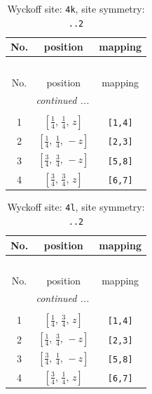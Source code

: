 \documentclass[fleqn,8pt]{jsarticle}
\begin{document}
\renewcommand{\arraystretch}{1.2}
\begin{longtable}{ccc}
\caption{Wyckoff site: {\tt 4k}, site symmetry: {\tt ..2}}
 \\
 \hline \hline
No. & position & mapping \\ \hline \endfirsthead

\multicolumn{2}{l}{\tablename\ \thetable{}} \\
 \hline \hline
No. & position & mapping \\ \hline \endhead

 \hline \hline
\multicolumn{2}{r}{\footnotesize\it continued ...} \\ \endfoot

 \hline \hline
\multicolumn{2}{r}{} \\ \endlastfoot

1 & $\left[ \frac{1}{4},\, \frac{1}{4},\, z \right]$ & {\tt [1,4]} \\ \hline
2 & $\left[ \frac{1}{4},\, \frac{1}{4},\, - z \right]$ & {\tt [2,3]} \\ \hline
3 & $\left[ \frac{3}{4},\, \frac{3}{4},\, - z \right]$ & {\tt [5,8]} \\ \hline
4 & $\left[ \frac{3}{4},\, \frac{3}{4},\, z \right]$ & {\tt [6,7]} \\
\end{longtable}
\renewcommand{\arraystretch}{1.2}
\begin{longtable}{ccc}
\caption{Wyckoff site: {\tt 4l}, site symmetry: {\tt ..2}}
 \\
 \hline \hline
No. & position & mapping \\ \hline \endfirsthead

\multicolumn{2}{l}{\tablename\ \thetable{}} \\
 \hline \hline
No. & position & mapping \\ \hline \endhead

 \hline \hline
\multicolumn{2}{r}{\footnotesize\it continued ...} \\ \endfoot

 \hline \hline
\multicolumn{2}{r}{} \\ \endlastfoot

1 & $\left[ \frac{1}{4},\, \frac{3}{4},\, z \right]$ & {\tt [1,4]} \\ \hline
2 & $\left[ \frac{1}{4},\, \frac{3}{4},\, - z \right]$ & {\tt [2,3]} \\ \hline
3 & $\left[ \frac{3}{4},\, \frac{1}{4},\, - z \right]$ & {\tt [5,8]} \\ \hline
4 & $\left[ \frac{3}{4},\, \frac{1}{4},\, z \right]$ & {\tt [6,7]} \\
\end{longtable}
\end{document}
